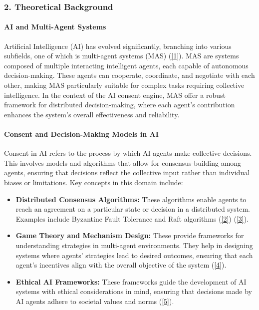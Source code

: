 \hypertarget{theoretical-background}{%
\subsubsection{2. Theoretical Background}\label{theoretical-background}}

\hypertarget{ai-and-multi-agent-systems}{%
\paragraph{AI and Multi-Agent
Systems}\label{ai-and-multi-agent-systems}}

Artificial Intelligence (AI) has evolved significantly, branching into
various subfields, one of which is multi-agent systems (MAS)
(\protect\hyperlink{1}{{[}1{]}}). MAS are systems composed of multiple
interacting intelligent agents, each capable of autonomous
decision-making. These agents can cooperate, coordinate, and negotiate
with each other, making MAS particularly suitable for complex tasks
requiring collective intelligence. In the context of the AI consent
engine, MAS offer a robust framework for distributed decision-making,
where each agent's contribution enhances the system's overall
effectiveness and reliability.

\hypertarget{consent-and-decision-making-models-in-ai}{%
\paragraph{Consent and Decision-Making Models in
AI}\label{consent-and-decision-making-models-in-ai}}

Consent in AI refers to the process by which AI agents make collective
decisions. This involves models and algorithms that allow for
consensus-building among agents, ensuring that decisions reflect the
collective input rather than individual biases or limitations. Key
concepts in this domain include:

\begin{itemize}
\item
  \textbf{Distributed Consensus Algorithms:} These algorithms enable
  agents to reach an agreement on a particular state or decision in a
  distributed system. Examples include Byzantine Fault Tolerance and
  Raft algorithms (\protect\hyperlink{2}{{[}2{]}})
  (\protect\hyperlink{3}{{[}3{]}}).
\item
  \textbf{Game Theory and Mechanism Design:} These provide frameworks
  for understanding strategies in multi-agent environments. They help in
  designing systems where agents' strategies lead to desired outcomes,
  ensuring that each agent's incentives align with the overall objective
  of the system (\protect\hyperlink{4}{{[}4{]}}).
\item
  \textbf{Ethical AI Frameworks:} These frameworks guide the development
  of AI systems with ethical considerations in mind, ensuring that
  decisions made by AI agents adhere to societal values and norms
  (\protect\hyperlink{5}{{[}5{]}}).
\end{itemize}

